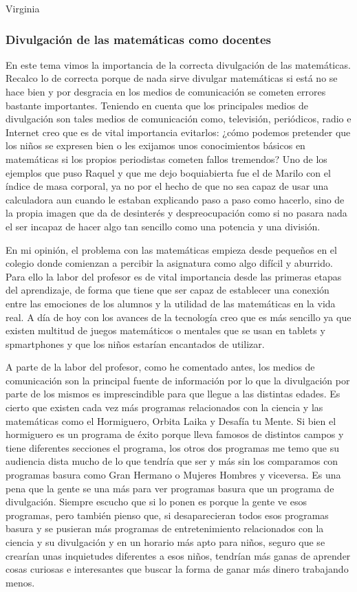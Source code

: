 \begin{opin}{\virgicolor}{Virginia}

\subsubsection{Divulgación de las matemáticas como docentes}

En este tema vimos la importancia de la correcta divulgación de las matemáticas.  Recalco lo de correcta porque de nada sirve divulgar matemáticas si está no se hace bien y por desgracia en los medios de comunicación se cometen errores bastante importantes. Teniendo en cuenta que los principales medios de divulgación son tales medios de comunicación como, televisión, periódicos, radio e Internet creo que es de vital importancia evitarlos: ¿cómo podemos pretender que los niños se expresen bien o les exijamos unos conocimientos básicos en matemáticas si los propios periodistas cometen fallos tremendos? Uno de los ejemplos que puso Raquel y que me dejo boquiabierta fue el de Marilo con el índice de masa corporal, ya no por el hecho de que no sea capaz de usar una calculadora aun cuando le estaban explicando paso a paso como hacerlo, sino de la propia imagen que da de desinterés y despreocupación como si no pasara nada el ser incapaz de hacer algo tan sencillo como una potencia y una división.

En mi opinión, el problema con las matemáticas empieza desde pequeños en el colegio donde comienzan a percibir la asignatura como algo difícil y aburrido. Para ello la labor del profesor es de vital importancia desde las primeras etapas del aprendizaje, de forma que tiene que ser capaz de establecer una conexión entre las emociones de los alumnos y la utilidad de las matemáticas en la vida real. A día de hoy con los avances de la tecnología creo que es más sencillo ya que existen multitud de juegos matemáticos o mentales que se usan en tablets y spmartphones y que los niños estarían encantados de utilizar.

A parte de la labor del profesor, como he comentado antes, los medios de comunicación son la principal fuente de información por lo que la divulgación por parte de los mismos es imprescindible para que llegue a las distintas edades. Es cierto que existen cada vez más programas relacionados con la ciencia y las matemáticas como el Hormiguero, Orbita Laika y Desafía tu Mente. Si bien el hormiguero es un programa de éxito porque lleva famosos de distintos campos y tiene diferentes secciones el programa, los otros dos programas me temo que su audiencia dista mucho de lo que tendría que ser y más sin los comparamos con programas basura como Gran Hermano o Mujeres Hombres y viceversa.  Es una pena que la gente se una más para ver programas basura que un programa de divulgación. Siempre escucho que si lo ponen es porque la gente ve esos programas, pero también pienso que, si desaparecieran todos esos programas basura y se pusieran más programas de entretenimiento relacionados con la ciencia y su divulgación y en un horario más apto para niños, seguro que se crearían unas inquietudes diferentes a esos niños, tendrían más ganas de aprender cosas curiosas e interesantes que buscar la forma de ganar más dinero trabajando menos.


\end{opin}
